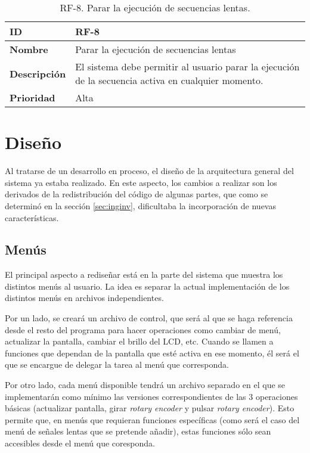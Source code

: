 \begin{table}[h!]
    \centering
    \begin{tabular}{|m{2.5cm}|m{9.27cm}|}
        \hline
        \textbf{ID} & RF-8 \\
        \hline
        \textbf{Nombre} & Parar la ejecución de secuencias lentas \\
        \hline
        \textbf{Descripción} & El sistema debe permitir al usuario parar la ejecución de la secuencia activa en cualquier momento. \\
        \hline
        \textbf{Prioridad} & Alta \\
        \hline
    \end{tabular}
    \caption{RF-8. Parar la ejecución de secuencias lentas.}
\end{table}

\section{Diseño}
\label{sec:fw_diseño}

Al tratarse de un desarrollo en proceso, el diseño de la arquitectura general del sistema ya estaba realizado. En este aspecto, los cambios a realizar son los derivados de la redistribución del código de algunas partes, que como se determinó en la sección \ref{sec:inginv}, dificultaba la incorporación de nuevas características.

\subsection{Menús}

El principal aspecto a rediseñar está en la parte del sistema que muestra los distintos menús al usuario. La idea es separar la actual implementación de los distintos menús en archivos independientes.

Por un lado, se creará un archivo de control, que será al que se haga referencia desde el resto del programa para hacer operaciones como cambiar de menú, actualizar la pantalla, cambiar el brillo del LCD, etc. Cuando se llamen a funciones que dependan de la pantalla que esté activa en ese momento, él será el que se encargue de delegar la tarea al menú que corresponda.

Por otro lado, cada menú disponible tendrá un archivo separado en el que se implementarán como mínimo las versiones correspondientes de las 3 operaciones básicas (actualizar pantalla, girar \textit{rotary encoder} y pulsar \textit{rotary encoder}). Esto permite que, en menús que requieran funciones específicas (como será el caso del menú de señales lentas que se pretende añadir), estas funciones sólo sean accesibles desde el menú que coresponda.

